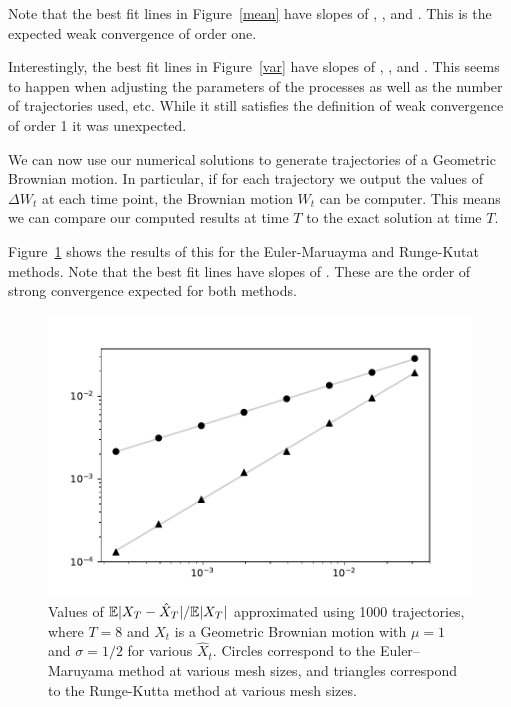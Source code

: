 \documentclass[12pt]{article}
\begin{document}
Note that the best fit lines in Figure~\ref{mean} have slopes of \protect\unskip, \protect\unskip, and \protectrespectively. This is the expected weak convergence of order one.


Interestingly, the best fit lines in Figure~\ref{var} have slopes of \protect\unskip, \protect\unskip, and \protectrespectively. This seems to happen when adjusting the parameters of the processes as well as the number of trajectories used, etc. While it still satisfies the definition of weak convergence of order 1 it was unexpected.

We can now use our numerical solutions to generate trajectories of a Geometric Brownian motion. In particular, if for each trajectory we output the values of \( \Delta W_t \) at each time point, the Brownian motion \( W_t \) can be computer. This means we can compare our computed results at time \( T \) to the exact solution at time \( T \).

Figure~\ref{strong_order_test} shows the results of this for the Euler-Maruayma and Runge-Kutat methods. Note that the best fit lines have slopes of \protectand \protectrespectively. These are the order of strong convergence expected for both methods.

\begin{figure}[t!]\centering
    \includegraphics[width=.5\textwidth]{img/strong_order_1000.pdf}
    \caption{Values of \( \mathbb{E}|X_T - \hat{X}_T|/\mathbb{E}|X_T| \) approximated using 1000 trajectories, where \( T = 8 \) and \( X_t \) is a Geometric Brownian motion with \( \mu = 1 \) and \( \sigma = 1/2 \) for various \( \hat{X}_t \).  Circles correspond to the Euler--Maruyama method at various mesh sizes, and triangles correspond to the Runge-Kutta method at various mesh sizes.}
\label{strong_order_test}
\end{figure}
\end{document}

